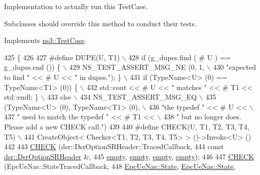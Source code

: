 Implementation to actually run this Test\+Case. 

Subclasses should override this method to conduct their tests. 

Implements \hyperlink{classns3_1_1TestCase_a8ff74680cf017ed42011e4be51917a24}{ns3\+::\+Test\+Case}.


\begin{DoxyCode}
425 \{
426 
427 \textcolor{preprocessor}{#define DUPE(U, T1)                                                     \(\backslash\)}
428 \textcolor{preprocessor}{  if (g\_dupes.find ( # U ) == g\_dupes.end ()) \{                           \(\backslash\)}
429 \textcolor{preprocessor}{      NS\_TEST\_ASSERT\_MSG\_NE (0, 1,                                        \(\backslash\)}
430 \textcolor{preprocessor}{                             "expected to find " <<  # U << " in dupes."); \}  \(\backslash\)}
431 \textcolor{preprocessor}{  if (TypeName<U> (0) == TypeName<T1> (0)) \{                              \(\backslash\)}
432 \textcolor{preprocessor}{      std::cout << # U << " matches " << # T1  << std::endl; \}              \(\backslash\)}
433 \textcolor{preprocessor}{  else                                                                  \(\backslash\)}
434 \textcolor{preprocessor}{    NS\_TEST\_ASSERT\_MSG\_EQ                                               \(\backslash\)}
435 \textcolor{preprocessor}{      (TypeName<U> (0), TypeName<T1> (0),                               \(\backslash\)}
436 \textcolor{preprocessor}{      "the typedef " << # U <<                                         \(\backslash\)}
437 \textcolor{preprocessor}{      " used to match the typedef " << # T1 <<                         \(\backslash\)}
438 \textcolor{preprocessor}{      " but no longer does.  Please add a new CHECK call.")}
439 
440 \textcolor{preprocessor}{#define CHECK(U, T1, T2, T3, T4, T5)                                    \(\backslash\)}
441 \textcolor{preprocessor}{  CreateObject< Checker<T1, T2, T3, T4, T5> > ()->Invoke<U> ()}
442 
443   \hyperlink{traced-callback-typedef-test-suite_8cc_aa79806eee113005f96d9d3cb1480ce98}{CHECK} (dsr::DsrOptionSRHeader::TracedCallback,
444          \textcolor{keyword}{const} \hyperlink{classns3_1_1dsr_1_1DsrOptionSRHeader}{dsr::DsrOptionSRHeader} &,
445          \hyperlink{classns3_1_1empty}{empty}, \hyperlink{classns3_1_1empty}{empty}, \hyperlink{classns3_1_1empty}{empty}, \hyperlink{classns3_1_1empty}{empty});
446 
447   \hyperlink{traced-callback-typedef-test-suite_8cc_aa79806eee113005f96d9d3cb1480ce98}{CHECK} (EpcUeNas::StateTracedCallback,
448          \hyperlink{classns3_1_1EpcUeNas_a8047255fecfac11c9e1abe6f13d527dc}{EpcUeNas::State}, \hyperlink{classns3_1_1EpcUeNas_a8047255fecfac11c9e1abe6f13d527dc}{EpcUeNas::State},

\end{DoxyCode}
